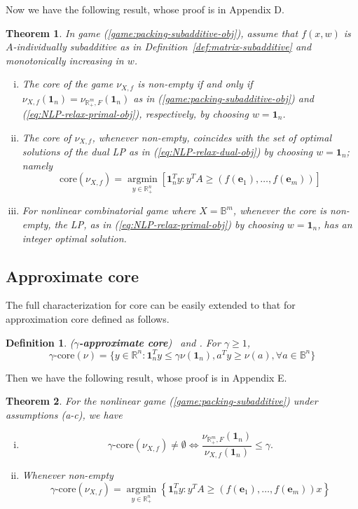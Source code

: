 \documentclass[11pt]{article}\usepackage[]{graphicx}\usepackage[]{xcolor}
\newtheorem{thm}{Theorem}
\newtheorem{deff}{Definition}
\DeclareMathOperator*{\argmin}{argmin}
\begin{document}
Now we have the following result, whose proof is in Appendix D. 
\begin{thm}\label{thm:nonlinear-packing-game-obj-constraint}
In game (\ref{game:packing-subadditive-obj}), assume that $f(x, w)$ is $A$-individually subadditive as in Definition~\ref{def:matrix-subadditive} and monotonically increasing in $w$. 
\begin{enumerate}[(i)]
\item The core of the game $\nu_{X, f}$ is non-empty if and only if $\nu_{X, f}\left(\mathbf{1}_n\right)=\nu_{\mathbb{R}^m_{+}, F}\left(\mathbf{1}_n\right)$ as in (\ref{game:packing-subadditive-obj}) and (\ref{eq:NLP-relax-primal-obj}), respectively, by choosing $w=\mathbf{1}_n$.

\item The core of $\nu_{X, f}$, whenever non-empty, coincides with the set of optimal solutions of the dual LP as in (\ref{eq:NLP-relax-dual-obj}) by choosing $w=\mathbf{1}_n$; namely
 \[
 \text{core} \left(\nu_{X, f}\right)=\argmin\limits_{y\in \mathbb{R}^n_{+}} \left[\mathbf{1}_n^Ty: y^TA\ge (f(\mathbf{e}_1),\dots, f(\mathbf{e}_m))\right]
 \]
\item For nonlinear combinatorial game where $X=\mathbb{B}^m$, whenever the core is non-empty, the LP, as in (\ref{eq:NLP-relax-primal-obj}) by choosing $w=\mathbf{1}_n$, has an integer optimal solution. 
\end{enumerate}
\end{thm}

\subsection{Approximate core}\label{subsec:appro-core}
The full characterization for core can be easily extended to that for approximation core defined as follows. 
\begin{deff}\label{def:appro-core} (\textbf{$\gamma$-approximate core})~\citep[Def. 15.7; Page 389]{nisan2007algorithmic} and \citep[Lemma 2.2; Page 20]{qui2013fractional}. For $\gamma\ge 1$, 
\[
\gamma\text{-core}(\nu)=\{y\in\mathbb{R}^n: \mathbf{1}_n^Ty\le \gamma \nu\left(\mathbf{1}_n\right), a^Ty\ge \nu(a), \forall a\in\mathbb{B}^n\}
\]
\end{deff}

Then we have the following result, whose proof is in Appendix E. 
\begin{thm}\label{thm:appro-core} For the nonlinear game (\ref{game:packing-subadditive}) under assumptions (a-c), we have
\begin{enumerate}[(i)]
\item 
\[
\gamma\text{-core}\left(\nu_{X, f}\right)\ne\emptyset \iff \frac{\nu_{\mathbb{R}^m_{+}, F}\left(\mathbf{1}_n\right)}{\nu_{X, f}\left(\mathbf{1}_n\right)}\le \gamma.
\]
\item Whenever non-empty
\[
\gamma\text{-core}\left(\nu_{X, f}\right)=\argmin\limits_{y\in\mathbb{R}^{n}_{+}}\left\{\mathbf{1}_n^Ty: y^TA\ge (f(\mathbf{e}_1),\dots, f(\mathbf{e}_m))x\right\}
\]
\end{enumerate}
\end{thm}
\end{document}
